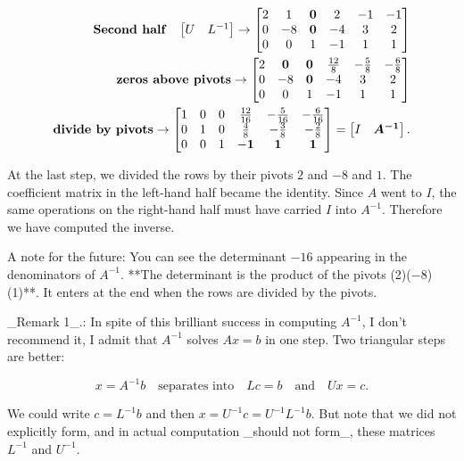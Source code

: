 \[\begin{split}\text{\bf Second half}\quad\begin{bmatrix}U&L^{-1} \end{bmatrix}\to\begin{bmatrix}2&1&\boldsymbol{0}&2&-1&-1\\ 0&-8&\boldsymbol{0}&-4&3&2\\ 0&0&1&-1&1&1\end{bmatrix}\\ \text{\bf zeros above pivots}\to\begin{bmatrix}2&\boldsymbol{0}& \boldsymbol{0}&\frac{12}{8}&-\frac{5}{8}&-\frac{6}{8}\\ 0&-8&\boldsymbol{0}&-4&3&2\\ 0&0&1&-1&1&1\end{bmatrix}\\ \text{\bf divide by pivots}\to\begin{bmatrix}1&0&0&\frac{12}{16}&-\frac{5}{16}&- \frac{6}{16}\\ 0&1&0&\frac{4}{8}&-\frac{3}{8}&-\frac{2}{8}\\ 0&0&1&-\boldsymbol{1}&\boldsymbol{1}&\boldsymbol{1}\end{bmatrix}=\begin{bmatrix} I&\boldsymbol{A^{-1}}\end{bmatrix}.\end{split}\]

At the last step, we divided the rows by their pivots \(2\) and \(-8\) and \(1\). The coefficient matrix in the left-hand half became the identity. Since \(A\) went to \(I\), the same operations on the right-hand half must have carried \(I\) into \(A^{-1}\). Therefore we have computed the inverse.

A note for the future: You can see the determinant \(-16\) appearing in the denominators of \(A^{-1}\). **The determinant is the product of the pivots (2)(\(-\)8)(1)**. It enters at the end when the rows are divided by the pivots.

_Remark 1_.: In spite of this brilliant success in computing \(A^{-1}\), I don't recommend it, I admit that \(A^{-1}\) solves \(Ax=b\) in one step. Two triangular steps are better:

\[x=A^{-1}b\quad\text{separates into}\quad Lc=b\quad\text{and}\quad Ux=c.\]

We could write \(c=L^{-1}b\) and then \(x=U^{-1}c=U^{-1}L^{-1}b\). But note that we did not explicitly form, and in actual computation _should not form_, these matrices \(L^{-1}\) and \(U^{-1}\).

